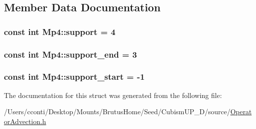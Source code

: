 \subsection{Member Data Documentation}
\hypertarget{struct_mp4_a9601f80a27b6863d3923fc9d2f45fd20}{}
\subsubsection[{support}]{\setlength{\rightskip}{0pt plus 5cm}const int Mp4\+::support = 4\hspace{0.3cm}{\ttfamily [static]}}\label{struct_mp4_a9601f80a27b6863d3923fc9d2f45fd20}
\hypertarget{struct_mp4_a90b6d0fb8de4d7850d5c95272c74878a}{}
\subsubsection[{support\+\_\+end}]{\setlength{\rightskip}{0pt plus 5cm}const int Mp4\+::support\+\_\+end = 3\hspace{0.3cm}{\ttfamily [static]}}\label{struct_mp4_a90b6d0fb8de4d7850d5c95272c74878a}
\hypertarget{struct_mp4_ab2bf493e922fb8082f05ca118cd472b3}{}
\subsubsection[{support\+\_\+start}]{\setlength{\rightskip}{0pt plus 5cm}const int Mp4\+::support\+\_\+start = -\/1\hspace{0.3cm}{\ttfamily [static]}}\label{struct_mp4_ab2bf493e922fb8082f05ca118cd472b3}


The documentation for this struct was generated from the following file\+:\begin{DoxyCompactItemize}
\item 
/\+Users/cconti/\+Desktop/\+Mounts/\+Brutus\+Home/\+Seed/\+Cubism\+U\+P\+\_\+D/source/\hyperlink{_operator_advection_8h}{Operator\+Advection.\+h}\end{DoxyCompactItemize}
